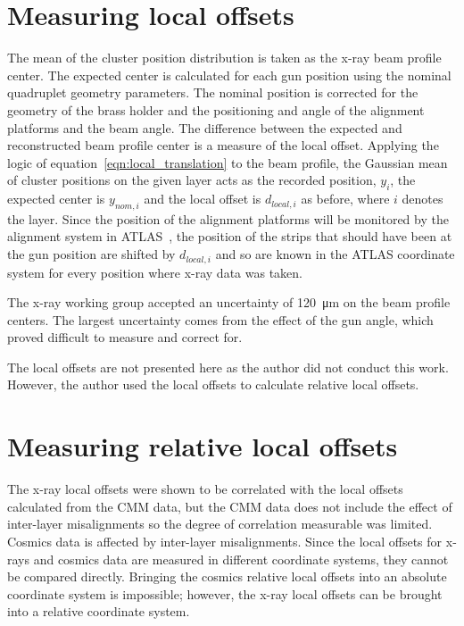 \section{Measuring local offsets}
The mean of the cluster position distribution is taken as the x-ray beam profile center. The expected center is calculated for each gun position using the nominal quadruplet geometry parameters. The nominal position is corrected for the geometry of the brass holder and the positioning and angle of the alignment platforms and the beam angle. The difference between the expected and reconstructed beam profile center is a measure of the local offset. Applying the logic of equation~\ref{eqn:local_translation} to the beam profile, the Gaussian mean of cluster positions on the given layer acts as the recorded position, $y_i$, the expected center is $y_{nom, i}$ and the local offset is $d_{local, i}$ as before, where $i$ denotes the layer. Since the position of the alignment platforms will be monitored by the alignment system in ATLAS~\cite{nsw_tdr}, the position of the strips that should have been at the gun position are shifted by $d_{local, i}$ and so are known in the ATLAS coordinate system for every position where x-ray data was taken.

The x-ray working group accepted an uncertainty of \SI{120}{\micro\meter} on the beam profile centers. The largest uncertainty comes from the effect of the gun angle, which proved difficult to measure and correct for.

The local offsets are not presented here as the author did not conduct this work. However, the author used the local offsets to calculate relative local offsets.

\section{Measuring relative local offsets}

The x-ray local offsets were shown to be correlated with the local offsets calculated from the CMM data, but the CMM data does not include the effect of inter-layer misalignments so the degree of correlation measurable was limited. Cosmics data is affected by inter-layer misalignments. Since the local offsets for x-rays and cosmics data are measured in different coordinate systems, they cannot be compared directly. Bringing the cosmics relative local offsets into an absolute coordinate system is impossible; however, the x-ray local offsets can be brought into a relative coordinate system.

